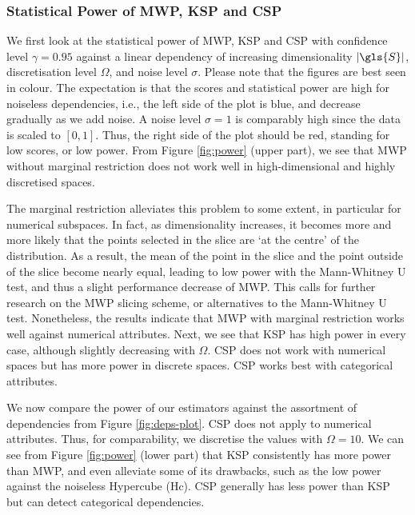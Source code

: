 \subsubsection{Statistical Power of \gls{MWP}, \gls{KSP} and \gls{CSP}}

We first look at the statistical power of \gls{MWP}, \gls{KSP} and \gls{CSP} with confidence level $\gamma = 0.95$  against a linear dependency of increasing dimensionality $|\gls{S}|$, discretisation level $\Omega$, and noise level $\sigma$. 
Please note that the figures are best seen in colour. 
The expectation is that the scores and statistical power are high for noiseless dependencies, i.e., the left side of the plot is blue, and decrease gradually as we add noise. A noise level $\sigma = 1$ is comparably high since the data is scaled to $[0,1]$. Thus, the right side of the plot should be red, standing for low scores, or low power. 
From Figure \ref{fig:power} (upper part), we see that \gls{MWP} without marginal restriction does not work well in high-dimensional and highly discretised spaces. 

The marginal restriction alleviates this problem to some extent, in particular for numerical subspaces. 
In fact, as dimensionality increases, it becomes more and more likely that the points selected in the slice are `at the centre' of the distribution. 
As a result, the mean of the point in the slice and the point outside of the slice become nearly equal, leading to low power with the Mann-Whitney U test, and thus a slight performance decrease of \gls{MWP}. %
This calls for further research on the \gls{MWP} slicing scheme, or alternatives to the Mann-Whitney U test. 
Nonetheless, the results indicate that \gls{MWP} with marginal restriction works well against numerical attributes. Next, we see that \gls{KSP} has high power in every case, although slightly decreasing with $\Omega$. 
\gls{CSP} does not work with numerical spaces but has more power in discrete spaces. \gls{CSP} works best with categorical attributes. 

We now compare the power of our estimators against the assortment of dependencies from Figure \ref{fig:deps-plot}. 
\gls{CSP} does not apply to numerical attributes. Thus, for comparability, we discretise the values with $\Omega = 10$. We can see from Figure \ref{fig:power} (lower part) that \gls{KSP} consistently has more power than \gls{MWP}, and even alleviate some of its drawbacks, such as the low power against the noiseless Hypercube (Hc). 
\gls{CSP} generally has less power than \gls{KSP} but can detect categorical dependencies. 

